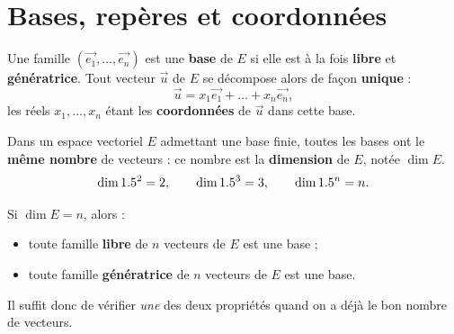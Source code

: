 \begin{illus}
\end{illus}

\section{Bases, repères et coordonnées}

\begin{definition}[Base]
Une famille $(\vec{e_1},\dots,\vec{e_n})$ est une \textbf{base} de $E$ si elle est à la fois
\textbf{libre} et \textbf{génératrice}. Tout vecteur $\vec u$ de $E$ se décompose alors de façon
\textbf{unique} :
\[
\vec u=x_1\vec{e_1}+\dots+x_n\vec{e_n},
\]
les réels $x_1,\dots,x_n$ étant les \textbf{coordonnées} de $\vec u$ dans cette base.
\end{definition}

\begin{theoreme}[Dimension]
Dans un espace vectoriel $E$ admettant une base finie, toutes les bases ont le \textbf{même nombre}
de vecteurs : ce nombre est la \textbf{dimension} de $E$, notée $\dim E$.
\[
\dim1.5^2=2,\qquad \dim1.5^3=3,\qquad \dim1.5^n=n.
\]
\end{theoreme}

\begin{propriete}
Si $\dim E=n$, alors :
\begin{itemize}
\item toute famille \textbf{libre} de $n$ vecteurs de $E$ est une base ;
\item toute famille \textbf{génératrice} de $n$ vecteurs de $E$ est une base.
\end{itemize}
Il suffit donc de vérifier \emph{une} des deux propriétés quand on a déjà le bon nombre de vecteurs.
\end{propriete}

